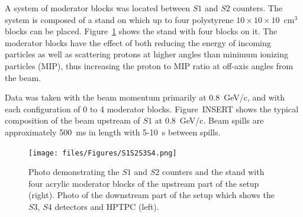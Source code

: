     
    A system of moderator blocks was located between $S1$ and $S2$ counters.  The system is composed of a stand on which up to four polystyrene $10\times10\times10$~cm$^3$ blocks can be placed. Figure~\ref{fig:modblocks} shows the stand with four blocks on it. The moderator blocks have the effect of both reducing the energy of incoming particles as well as scattering protons at higher angles than minimum ionizing particles (MIP), thus increasing the proton to MIP ratio at off-axis angles from the beam. 
    
    Data was taken with the beam momentum primarily at 0.8~GeV/c, and with each configuration of 0 to 4 moderator blocks. Figure~INSERT shows the typical composition of the beam upstream of $S1$ at 0.8~GeV/c. Beam spills are approximately 500~ms in length with 5-10~s between spills.  
    
    
    
    \begin{figure}[t]
      \centering
    \texttt{[image: files/Figures/S1S2S3S4.png]}
    	\caption{Photo demonstrating the $S1$ and $S2$ counters and the stand with four acrylic moderator blocks of the upstream part of the setup (right). Photo of the downstream part of the setup which shows the $S3$, $S4$ detectors and HPTPC (left).}
    		\label{fig:modblocks}
    \end{figure}
    
